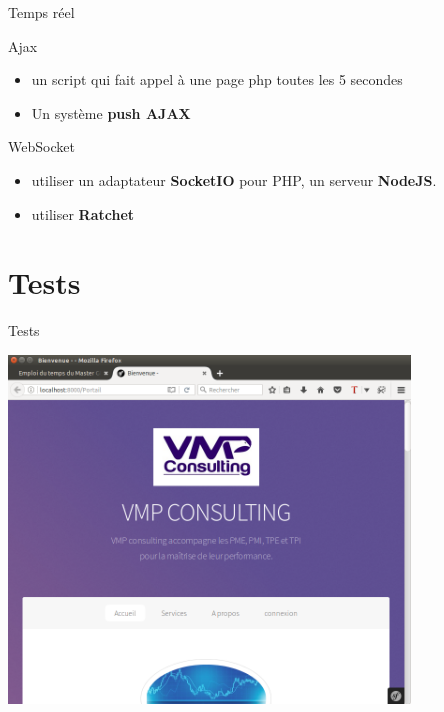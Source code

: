 \documentclass[french]{beamer}
\begin{document}
\begin{frame}{Temps réel}
\begin{alertblock}{Ajax}
\begin{itemize}
\item un script qui fait appel à une page php toutes les 5 secondes
\item Un système \textbf{push AJAX}
\end{itemize}
\end{alertblock}	
\pause
\begin{alertblock}{WebSocket}
\begin{itemize}
\item utiliser  un adaptateur \textbf{SocketIO} pour PHP, un serveur  \textbf{NodeJS}.
\item utiliser \textbf{Ratchet}
\end{itemize}
\end{alertblock}
	
	
\end{frame}

\section{Tests}
\begin{frame}{Tests}
\begin{center}

\href{http://localhost:8000/Portail}{\includegraphics[width=0.8\textwidth]{v1.png} }

	
	
	
\end{center}
\end{frame}
\end{document}
